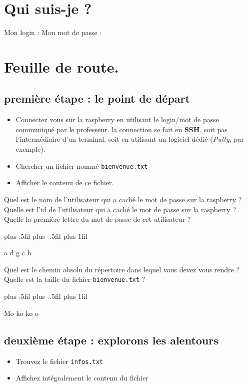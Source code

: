 \documentclass[a4paper,10pt,addpoints]{exam}
\newenvironment{oneparcheckboxescentering}{
	\begingroup
	\leftskip=80mm plus .5fil%
	\rightskip=0mm plus -.5fil%
	\parfillskip=0mm plus 1fil\relax
	\begin{oneparcheckboxes}
	}{
	\end{oneparcheckboxes}
	\par
	\endgroup
}
\begin{document}
\section{Qui suis-je ?}
	\begin{questions}
		\boxedpoints
	\question Mon login :
	\makeemptybox{1cm}
	\question Mon mot de passe : 
	\makeemptybox{1cm}

\section{Feuille de route.}
\subsection{première étape : le point de départ}
\setlength{\parindent}{6ex}
\begin{itemize}[label=$\leadsto$, font=\LARGE \color{blue}]
	\item Connectez vous sur la raspberry en utilisant le login/mot de passe communiqué par le professeur. la connection se fait en \textbf{SSH}, soit pas l'intermédiaire d'un terminal, soit en utilisant un logiciel dédié (\textit{Putty}, par exemple).
	\item Chercher un fichier nommé \verb|bienvenue.txt|
	\item Afficher le contenu de ce fichier.
\end{itemize}
	\question [1] Quel est le nom de l'utilisateur qui a caché le mot de passe sur la raspberry ?
	\setlength\answerlinelength{8cm}
	\answerline
	\question [1] Quelle est l'id de l'utilisateur qui a caché le mot de passe sur la raspberry ?
	\answerline
	\question [1] Quelle la première lettre du mot de passe de cet utilisateur ?
	\newline
	\checkboxchar{$\Box$}
	
	\begin{oneparcheckboxescentering}
	\choice a \choice d \choice g  \choice c \choice b
	\end{oneparcheckboxescentering}
	\question [1] Quel est le chemin absolu du répertoire dans lequel vous devez vous rendre ?
	\answerline
	\bonusquestion [1] Quelle est la taille du fichier \verb|bienvenue.txt|  ?
	\newline
	
	\begin{oneparcheckboxescentering}
		 Mo  ko  ko  o 
	\end{oneparcheckboxescentering}
\subsection{deuxième étape : explorons les alentours}
\begin{itemize}[label=$\leadsto$, font=\LARGE \color{blue}]
	\item Trouvez le fichier \verb|infos.txt|
	\item Affichez intégralement le contenu du fichier
\end{itemize}


\end{questions}
\end{document}
